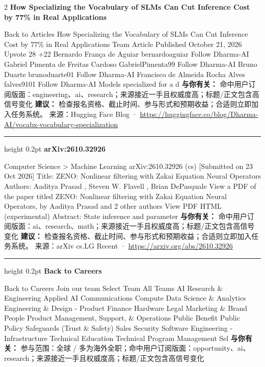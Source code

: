 \documentclass[10.5pt]{ctexart}
\begin{document}
\begin{multicols}{2}
{\large\bfseries How Specializing the Vocabulary of SLMs Can Cut Inference Cost by 77\% in Real Applications}\par
Back to Articles How Specializing the Vocabulary of SLMs Can Cut Inference Cost by 77\% in Real Applications Team Article Published October 21, 2026 Upvote 28 +22 Bernardo França de Aguiar bernardoaguiar Follow Dharma-AI Gabriel Pimenta de Freitas Cardoso GabrielPimenta99 Follow Dharma-AI Bruno Duarte brunoduarte01 Follow Dharma-AI Francisco de Almeida Rocha Alves falves9101 Follow Dharma-AI Models specialized for a d
\textbf{与你有关：} 命中用户订阅版面：engineering、ai、research；来源接近一手且权威度高；标题/正文包含高信号变化
\textbf{建议：} 检查报名资格、截止时间、参与形式和预期收益；合适则立即加入任务系统。
{\footnotesize\color{ormuted} 来源：Hugging Face Blog · \url{https://huggingface.co/blog/Dharma-AI/vocabx-vocabulary-specialization}}
\vspace{2mm}
\hrule height 0.2pt
\vspace{2mm}
{\large\bfseries arXiv:2610.32926}\par
Computer Science > Machine Learning arXiv:2610.32926 (cs) [Submitted on 23 Oct 2026] Title: ZENO: Nonlinear filtering with Zakai Equation Neural Operators Authors: Aaditya Prasad , Steven W. Flavell , Brian DePasquale View a PDF of the paper titled ZENO: Nonlinear filtering with Zakai Equation Neural Operators, by Aaditya Prasad and 2 other authors View PDF HTML (experimental) Abstract: State inference and parameter 
\textbf{与你有关：} 命中用户订阅版面：ai、research、math；来源接近一手且权威度高；标题/正文包含高信号变化
\textbf{建议：} 检查报名资格、截止时间、参与形式和预期收益；合适则立即加入任务系统。
{\footnotesize\color{ormuted} 来源：arXiv cs.LG Recent · \url{https://arxiv.org/abs/2610.32926}}
\vspace{2mm}
\hrule height 0.2pt
\vspace{2mm}
{\large\bfseries Back to Careers}\par
Back to Careers Join our team Select Team All Teams AI Research \& Engineering Applied AI Communications Compute Data Science \& Analytics Engineering \& Design - Product Finance Hardware Legal Marketing \& Brand People Product Management, Support, \& Operations Public Benefit Public Policy Safeguards (Trust \& Safety) Sales Security Software Engineering - Infrastructure Technical Education Technical Program Management Sel
\textbf{与你有关：} 参与范围：全球 / 多为海外全职；命中用户订阅版面：opportunity、ai、research；来源接近一手且权威度高；标题/正文包含高信号变化

\end{multicols}
\end{document}
